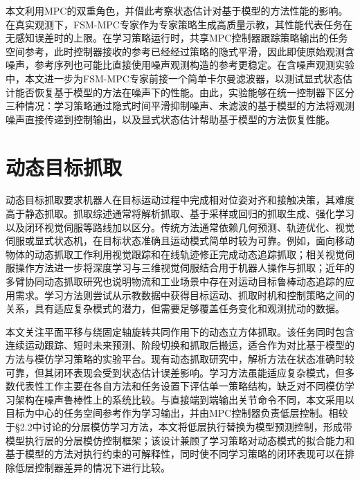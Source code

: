 本文利用MPC的双重角色，并借此考察状态估计对基于模型的方法性能的影响。在真实观测下，FSM-MPC专家作为专家策略生成高质量示教，其性能代表任务在无感知误差时的上限。在学习策略运行时，共享MPC控制器跟踪策略输出的任务空间参考，此时控制器接收的参考已经经过策略的隐式平滑，因此即使原始观测含噪声，参考序列也可能比直接使用噪声观测构造的参考更稳定。在含噪声观测实验中，本文进一步为FSM-MPC专家前接一个简单卡尔曼滤波器\citep{kalman1960new}，以测试显式状态估计能否恢复基于模型的方法在噪声下的性能。由此，实验能够在统一控制器下区分三种情况：学习策略通过隐式时间平滑抑制噪声、未滤波的基于模型的方法将观测噪声直接传递到控制输出，以及显式状态估计帮助基于模型的方法恢复性能。

\section{动态目标抓取}

动态目标抓取要求机器人在目标运动过程中完成相对位姿对齐和接触决策，其难度高于静态抓取。抓取综述通常将解析抓取、基于采样或回归的抓取生成、强化学习以及闭环视觉伺服等路线加以区分\citep{zhang2022robotic,newbury2023deep}。传统方法通常依赖几何预测、轨迹优化、视觉伺服或显式状态机，在目标状态准确且运动模式简单时较为可靠。例如，面向移动物体的动态抓取工作利用视觉跟踪和在线轨迹修正完成动态追踪抓取\citep{marturi2019dynamic}；相关视觉伺服操作方法进一步将深度学习与三维视觉伺服结合用于机器人操作与抓取\citep{alshanoon2022robotic}；近年的多臂协同动态抓取研究也说明物流和工业场景中存在对运动目标鲁棒动态追踪的应用需求\citep{he2026dynamicgrasping}。学习方法则尝试从示教数据中获得目标运动、抓取时机和控制策略之间的关系，具有适应复杂模式的潜力，但需要足够覆盖任务变化和观测扰动的数据。

本文关注平面平移与绕固定轴旋转共同作用下的动态立方体抓取。该任务同时包含连续运动跟踪、短时未来预测、阶段切换和抓取后搬运，适合作为对比基于模型的方法与模仿学习策略的实验平台。现有动态抓取研究中，解析方法在状态准确时较可靠，但其闭环表现会受到状态估计误差影响\citep{marturi2019dynamic,kayalibay2023filteraware}。学习方法虽能适应复杂模式，但多数代表性工作主要在各自方法和任务设置下评估单一策略结构，缺乏对不同模仿学习架构在噪声鲁棒性上的系统比较\citep{mandlekar2021matters,zhao2023learning,chi2023diffusion}。与直接端到端输出关节命令不同，本文采用以目标为中心的任务空间参考作为学习输出，并由MPC控制器负责低层控制。相较于§2.2中讨论的分层模仿学习方法，本文将低层执行替换为模型预测控制，形成带模型执行层的分层模仿控制框架；该设计兼顾了学习策略对动态模式的拟合能力和基于模型的方法对执行约束的可解释性，同时使不同学习策略的闭环表现可以在排除低层控制器差异的情况下进行比较\citep{lynch2020learning,mandlekar2020iris,wang2023mimicplay}。
